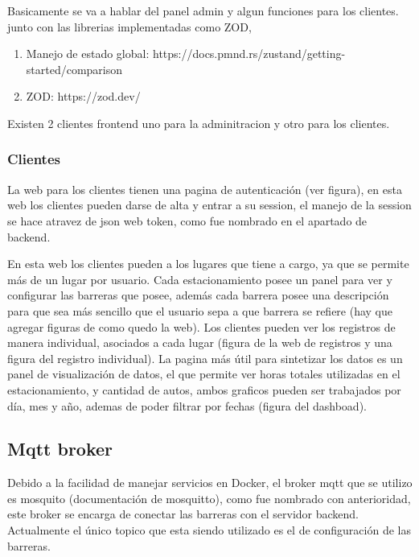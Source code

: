 Basicamente se va a hablar del panel admin y algun funciones para los clientes. junto con las librerias implementadas como ZOD,

\begin{enumerate}
        \item Manejo de estado global: https://docs.pmnd.rs/zustand/getting-started/comparison
        \item ZOD: https://zod.dev/
\end{enumerate}

Existen 2 clientes frontend uno para la adminitracion y otro para los clientes.

\subsubsection{Clientes}

La web para los clientes tienen una pagina de autenticación (ver figura), en esta web los clientes pueden darse de alta y entrar a su session, el manejo de la session se hace atravez de json web token, como fue nombrado en el apartado de backend.

En esta web los clientes pueden a los lugares que tiene a cargo, ya que se permite más de un lugar por usuario. Cada estacionamiento posee un panel para ver y configurar las barreras que posee, además cada barrera posee una descripción para que sea más sencillo que el usuario sepa a que barrera se refiere (hay que agregar figuras de como quedo la web). Los clientes pueden ver los registros de manera individual, asociados a cada lugar (figura de la web de registros y una figura del registro individual). La pagina más útil para sintetizar los datos es un panel de visualización de datos, el que permite ver horas totales utilizadas en el estacionamiento, y cantidad de autos, ambos graficos pueden ser trabajados por día, mes y año, ademas de poder filtrar por fechas (figura del dashboad).

\subsection{Mqtt broker}

Debido a la facilidad de manejar servicios en Docker, el broker mqtt que se utilizo es mosquito (documentación de mosquitto), como fue nombrado con anterioridad, este broker se encarga de conectar las barreras con el servidor backend. Actualmente el único topico que esta siendo utilizado es el de configuración de las barreras.

